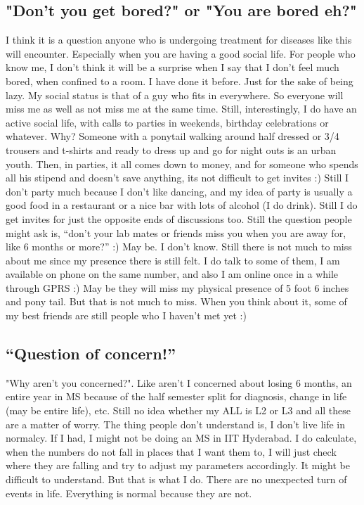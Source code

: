 \subsection*{"Don't you get bored?" or "You are bored eh?"} 

I think it is a question anyone who is undergoing treatment for diseases like this will encounter. 
Especially when you are having a good social life. For people who know me, I don't think it
will be a surprise when I say that I don't feel much bored, when confined to a room. I have done it before.
Just for the sake of being lazy. My social status is that of a guy who fits in everywhere. So 
everyone will miss me as well as not miss me at the same time. Still, interestingly, I do have an active
social life, with calls to parties in weekends, birthday celebrations or whatever. Why? Someone
with a ponytail walking around half dressed or 3/4 trousers and t-shirts and ready to dress up and 
go for night outs is an urban youth. Then, in parties, it all comes down to money, and for 
someone who spends all his stipend and doesn't save anything, its not difficult to get invites
:) Still I don't party much because I don't like dancing, and my idea of party is usually a good
food in a restaurant or a nice bar with lots of alcohol (I do drink). Still I do get invites
for just the opposite ends of discussions too. Still the question people might ask is, ``don't
your lab mates or friends miss you when you are away for, like 6 months or more?'' :) May be. I don't
know. Still there is not much to miss about me since my presence there is still felt. I do
talk to some of them, I am available on phone on the same number, and also I am online once in a while
through GPRS :) May be they will miss my physical presence of 5 foot 6 inches and pony tail. But
that is not much to miss. When you think about it, some of my best friends are still people who I
haven't met yet :) 

\subsection*{``Question of concern!''} 

"Why aren't you concerned?". Like aren't I concerned about losing 6 months, an entire year in MS because of the half 
semester split for diagnosis, change in life (may be entire life), etc. Still no idea whether my
ALL is L2 or L3 and all these are a matter of worry. The thing people don't understand is, I 
don't live life in normalcy. If I had, I might not be doing an MS in IIT Hyderabad. I do 
calculate, when the numbers do not fall in places that I want them to, I will just check where they are 
falling and try to adjust my parameters accordingly. It might be difficult to understand. But
that is what I do. There are no unexpected turn of events in life. Everything is normal because
they are not.

